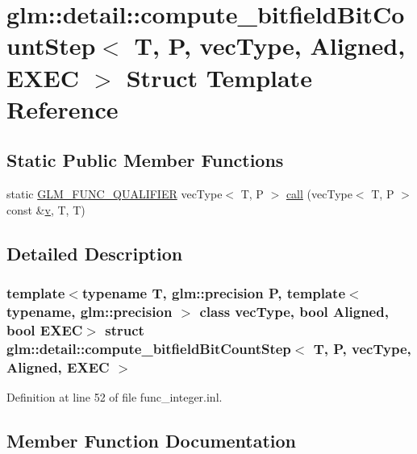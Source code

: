 \hypertarget{structglm_1_1detail_1_1compute__bitfield_bit_count_step}{}\section{glm\+::detail\+::compute\+\_\+bitfield\+Bit\+Count\+Step$<$ T, P, vec\+Type, Aligned, E\+X\+EC $>$ Struct Template Reference}
\label{structglm_1_1detail_1_1compute__bitfield_bit_count_step}
\subsection*{Static Public Member Functions}
\begin{DoxyCompactItemize}
\item 
static \mbox{\hyperlink{setup_8hpp_a33fdea6f91c5f834105f7415e2a64407}{G\+L\+M\+\_\+\+F\+U\+N\+C\+\_\+\+Q\+U\+A\+L\+I\+F\+I\+ER}} vec\+Type$<$ T, P $>$ \mbox{\hyperlink{structglm_1_1detail_1_1compute__bitfield_bit_count_step_a8683ebf8b1233db53ad5d99dbc1a6317}{call}} (vec\+Type$<$ T, P $>$ const \&\mbox{\hyperlink{glad_8h_a14cfbe2fc2234f5504618905b69d1e06}{v}}, T, T)
\end{DoxyCompactItemize}


\subsection{Detailed Description}
\subsubsection*{template$<$typename T, glm\+::precision P, template$<$ typename, glm\+::precision $>$ class vec\+Type, bool Aligned, bool E\+X\+EC$>$\newline
struct glm\+::detail\+::compute\+\_\+bitfield\+Bit\+Count\+Step$<$ T, P, vec\+Type, Aligned, E\+X\+E\+C $>$}



Definition at line 52 of file func\+\_\+integer.\+inl.



\subsection{Member Function Documentation}
\mbox{\label{structglm_1_1detail_1_1compute__bitfield_bit_count_step_a8683ebf8b1233db53ad5d99dbc1a6317}} 
